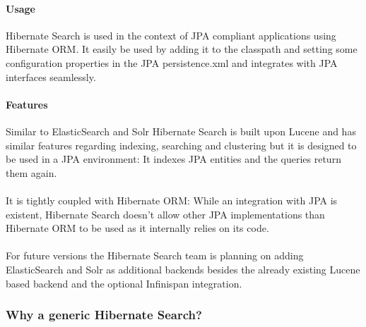 \paragraph{Usage}
Hibernate Search is used in the context of JPA compliant applications using Hibernate ORM. It easily be used by adding it to the classpath and setting some configuration properties in the JPA persistence.xml and integrates with JPA interfaces seamlessly. 

\paragraph{Features}
Similar to ElasticSearch and Solr Hibernate Search is built upon Lucene and has similar features regarding indexing, searching and clustering but it is designed to be used in a JPA environment: It indexes JPA entities and the queries return them again.
\\\\
It is tightly coupled with Hibernate ORM: While an integration with JPA is existent, Hibernate Search doesn't allow other JPA implementations than Hibernate ORM to be used as it internally relies on its code.
\\\\
For future versions the Hibernate Search team is planning on adding ElasticSearch and Solr as additional backends besides the already existing Lucene based backend and the optional Infinispan integration.

\pagebreak

\subsubsection{Why a generic Hibernate Search?}

